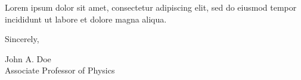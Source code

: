 \documentclass[11pt]{letter}
\begin{document}
Lorem ipsum dolor sit amet, consectetur adipiscing elit, sed do eiusmod tempor incididunt ut labore et dolore magna aliqua.

\vspace{1\baselineskip}

Sincerely,

\vspace{2\baselineskip} %

\noindent
John A. Doe\\
Associate Professor of Physics

\end{document}
